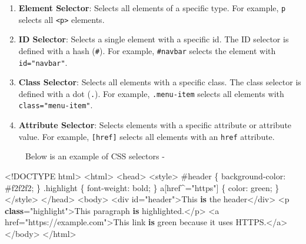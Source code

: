 \documentclass[
  letterpaper,
  DIV=11,
  numbers=noendperiod]{scrreprt}
\newenvironment{Shaded}{\begin{snugshade}}{\end{snugshade}}
\newcommand{\BuiltInTok}[1]{\textcolor[rgb]{0.00,0.23,0.31}{#1}}
\newcommand{\CommentTok}[1]{\textcolor[rgb]{0.37,0.37,0.37}{#1}}
\newcommand{\KeywordTok}[1]{\textcolor[rgb]{0.00,0.23,0.31}{\textbf{#1}}}
\newcommand{\NormalTok}[1]{\textcolor[rgb]{0.00,0.23,0.31}{#1}}
\newcommand{\OperatorTok}[1]{\textcolor[rgb]{0.37,0.37,0.37}{#1}}
\newcommand{\StringTok}[1]{\textcolor[rgb]{0.13,0.47,0.30}{#1}}
\begin{document}
\begin{enumerate}
\def\labelenumi{\arabic{enumi}.}
\item
  \textbf{Element Selector}: Selects all elements of a specific type.
  For example, \texttt{p} selects all
  \texttt{\textless{}p\textgreater{}} elements.
\item
  \textbf{ID Selector}: Selects a single element with a specific id. The
  ID selector is defined with a hash (\texttt{\#}). For example,
  \texttt{\#navbar} selects the element with \texttt{id="navbar"}.
\item
  \textbf{Class Selector}: Selects all elements with a specific class.
  The class selector is defined with a dot (\texttt{.}). For example,
  \texttt{.menu-item} selects all elements with
  \texttt{class="menu-item"}.
\item
  \textbf{Attribute Selector}: Selects elements with a specific
  attribute or attribute value. For example, \texttt{{[}href{]}} selects
  all elements with an \texttt{href} attribute.
\end{enumerate}

~~~~~Below is an example of CSS selectors -

\begin{Shaded}
\begin{Highlighting}[]
\OperatorTok{\textless{}!}\NormalTok{DOCTYPE html}\OperatorTok{\textgreater{}}
\OperatorTok{\textless{}}\NormalTok{html}\OperatorTok{\textgreater{}}
\OperatorTok{\textless{}}\NormalTok{head}\OperatorTok{\textgreater{}}
    \OperatorTok{\textless{}}\NormalTok{style}\OperatorTok{\textgreater{}}
        \CommentTok{\#header \{}
\NormalTok{            background}\OperatorTok{{-}}\NormalTok{color: }\CommentTok{\#f2f2f2;}
\NormalTok{        \}}
\NormalTok{        .highlight \{}
\NormalTok{            font}\OperatorTok{{-}}\NormalTok{weight: bold}\OperatorTok{;}
\NormalTok{        \}}
\NormalTok{        a[href}\OperatorTok{\^{}=}\StringTok{"https"}\NormalTok{] \{}
\NormalTok{            color: green}\OperatorTok{;}
\NormalTok{        \}}
    \OperatorTok{\textless{}/}\NormalTok{style}\OperatorTok{\textgreater{}}
\OperatorTok{\textless{}/}\NormalTok{head}\OperatorTok{\textgreater{}}
\OperatorTok{\textless{}}\NormalTok{body}\OperatorTok{\textgreater{}}
    \OperatorTok{\textless{}}\NormalTok{div }\BuiltInTok{id}\OperatorTok{=}\StringTok{"header"}\OperatorTok{\textgreater{}}\NormalTok{This }\KeywordTok{is}\NormalTok{ the header}\OperatorTok{\textless{}/}\NormalTok{div}\OperatorTok{\textgreater{}}
    \OperatorTok{\textless{}}\NormalTok{p }\KeywordTok{class}\OperatorTok{=}\StringTok{"highlight"}\OperatorTok{\textgreater{}}\NormalTok{This paragraph }\KeywordTok{is}\NormalTok{ highlighted.}\OperatorTok{\textless{}/}\NormalTok{p}\OperatorTok{\textgreater{}}
    \OperatorTok{\textless{}}\NormalTok{a href}\OperatorTok{=}\StringTok{"https://example.com"}\OperatorTok{\textgreater{}}\NormalTok{This link }\KeywordTok{is}\NormalTok{ green because it uses HTTPS.}\OperatorTok{\textless{}/}\NormalTok{a}\OperatorTok{\textgreater{}}
\OperatorTok{\textless{}/}\NormalTok{body}\OperatorTok{\textgreater{}}
\OperatorTok{\textless{}/}\NormalTok{html}\OperatorTok{\textgreater{}}
\end{Highlighting}
\end{Shaded}
\end{document}
